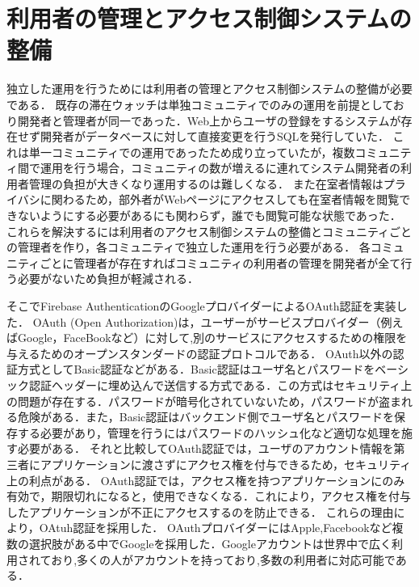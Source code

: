 

\section{利用者の管理とアクセス制御システムの整備}\label{4.2}
独立した運用を行うためには利用者の管理とアクセス制御システムの整備が必要である．
既存の滞在ウォッチは単独コミュニティでのみの運用を前提としており開発者と管理者が同一であった．Web上からユーザの登録をするシステムが存在せず開発者がデータベースに対して直接変更を行うSQLを発行していた．
これは単一コミュニティでの運用であったため成り立っていたが，複数コミュニティ間で運用を行う場合，コミュニティの数が増えるに連れてシステム開発者の利用者管理の負担が大きくなり運用するのは難しくなる．
また在室者情報はプライバシに関わるため，部外者がWebページにアクセスしても在室者情報を閲覧できないようにする必要があるにも関わらず，誰でも閲覧可能な状態であった．
これらを解決するには利用者のアクセス制御システムの整備とコミュニティごとの管理者を作り，各コミュニティで独立した運用を行う必要がある．
各コミュニティごとに管理者が存在すればコミュニティの利用者の管理を開発者が全て行う必要がないため負担が軽減される．


そこでFirebase AuthenticationのGoogleプロバイダーによるOAuth認証を実装した．
OAuth (Open Authorization)は，ユーザーがサービスプロバイダー（例えばGoogle，FaceBookなど）に対して,別のサービスにアクセスするための権限を与えるためのオープンスタンダードの認証プロトコルである．
OAuth以外の認証方式としてBasic認証などがある．Basic認証はユーザ名とパスワードをベーシック認証ヘッダーに埋め込んで送信する方式である．この方式はセキュリティ上の問題が存在する．パスワードが暗号化されていないため，パスワードが盗まれる危険がある．また，Basic認証はバックエンド側でユーザ名とパスワードを保存する必要があり，管理を行うにはパスワードのハッシュ化など適切な処理を施す必要がある．
それと比較してOAuth認証では，ユーザのアカウント情報を第三者にアプリケーションに渡さずにアクセス権を付与できるため，セキュリティ上の利点がある．
OAuth認証では，アクセス権を持つアプリケーションにのみ有効で，期限切れになると，使用できなくなる．これにより，アクセス権を付与したアプリケーションが不正にアクセスするのを防止できる．
これらの理由により，OAtuh認証を採用した．
OAuthプロバイダーにはApple,Facebookなど複数の選択肢がある中でGoogleを採用した．Googleアカウントは世界中で広く利用されており,多くの人がアカウントを持っており,多数の利用者に対応可能である．

